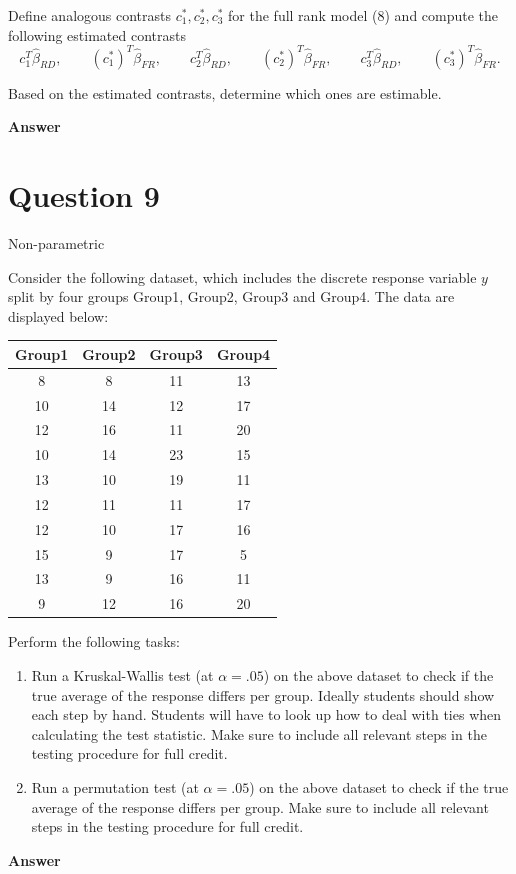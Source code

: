 \documentclass[letterpaper]{article}
\begin{document}
\begin{enumerate}
		Define analogous contrasts $c_1^*,c_2^*,c_3^*$ for the full rank model (8) and compute the following estimated contrasts
		\[
		c_1^T\hat{\beta}_{RD},
		\qquad
		(c_1^*)^T\hat{\beta}_{FR},
		\qquad
		c_2^T\hat{\beta}_{RD},
		\qquad
		(c_2^*)^T\hat{\beta}_{FR},
		\qquad
		c_3^T\hat{\beta}_{RD},
		\qquad
		(c_3^*)^T\hat{\beta}_{FR}.
		\]
		
		Based on the estimated contrasts, determine which ones are estimable.
	\end{enumerate}
	
		\textbf{Answer}
	
	\clearpage
	
	\section{Question 9}
	{\color{deepred}   Non-parametric}
	
	Consider the following dataset, which includes the discrete response variable $y$ split by four groups Group1, Group2, Group3 and Group4. The data are displayed below:
	
	\begin{center}
		\begin{tabular}{c c c c}
			\hline
			Group1 & Group2 & Group3 & Group4 \\
			\hline
			8  & 8  & 11 & 13 \\
			10 & 14 & 12 & 17 \\
			12 & 16 & 11 & 20 \\
			10 & 14 & 23 & 15 \\
			13 & 10 & 19 & 11 \\
			12 & 11 & 11 & 17 \\
			12 & 10 & 17 & 16 \\
			15 & 9  & 17 & 5 \\
			13 & 9  & 16 & 11 \\
			9  & 12 & 16 & 20 \\
			\hline
		\end{tabular}
	\end{center}
	
	Perform the following tasks:
	\begin{enumerate}
		\item[(i)] Run a Kruskal-Wallis test (at $\alpha=.05$) on the above dataset to check if the true average of the response differs per group. Ideally students should show each step by hand. Students will have to look up how to deal with ties when calculating the test statistic. Make sure to include all relevant steps in the testing procedure for full credit.
		
		\item[(ii)] Run a permutation test (at $\alpha=.05$) on the above dataset to check if the true average of the response differs per group. Make sure to include all relevant steps in the testing procedure for full credit.
	\end{enumerate}
	
	\textbf{Answer}
	
	\clearpage
	
		
		
		
	
\end{document}
